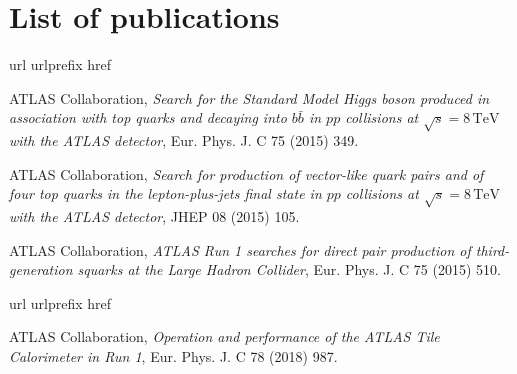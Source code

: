 \section{List of publications}

\vspace{0.5cm}
\begin{thebibliography}{10}
\makeatletter
\renewcommand\@biblabel[1]{}
\makeatother
\expandafter\ifx\csname url\endcsname\relax
  \def\url#1{\texttt{#1}}\fi
\expandafter\ifx\csname urlprefix\endcsname\relax\def\urlprefix{URL }\fi
\expandafter\ifx\csname href\endcsname\relax
  \def\href#1#2{#2} \def\path#1{#1}\fi

{ATLAS Collaboration}, {\em Search for the Standard Model Higgs boson produced in
  association with top quarks and decaying into \(b\bar{b}\) in \(pp\)
  collisions at \(\sqrt{s} = 8\,\text{TeV}\) with the ATLAS detector}, 
  {Eur. Phys. J. C 75 (2015) 349}.


{ATLAS Collaboration}, {\em Search for production of vector-like quark pairs and of
  four top quarks in the lepton-plus-jets final state in \(pp\) collisions at
  \(\sqrt{s} = 8\,\text{TeV}\) with the ATLAS detector}, 
  {JHEP 08 (2015) 105}.

{ATLAS Collaboration}, {\em ATLAS Run 1 searches for direct pair production of
  third-generation squarks at the Large Hadron Collider}, 
  {Eur. Phys. J. C 75 (2015) 510}.
\end{thebibliography}


\vspace{0.5cm}
\begin{thebibliography}{10}
\makeatletter
\renewcommand\@biblabel[1]{}
\makeatother
\expandafter\ifx\csname url\endcsname\relax
  \def\url#1{\texttt{#1}}\fi
\expandafter\ifx\csname urlprefix\endcsname\relax\def\urlprefix{URL }\fi
\expandafter\ifx\csname href\endcsname\relax
  \def\href#1#2{#2} \def\path#1{#1}\fi

{ATLAS Collaboration}, {\em Operation and performance of the ATLAS Tile Calorimeter
  in Run 1},
  {Eur. Phys. J. C 78 (2018) 987}.
  
\end{thebibliography}



